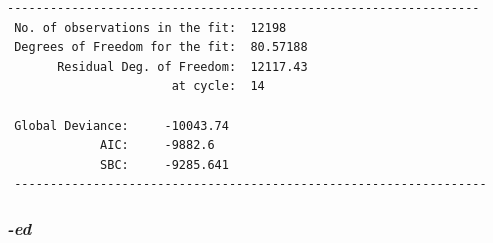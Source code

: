 \documentclass[
]{article}
\begin{document}
\begin{verbatim}
------------------------------------------------------------------ 
 No. of observations in the fit:  12198  
 Degrees of Freedom for the fit:  80.57188 
       Residual Deg. of Freedom:  12117.43  
                       at cycle:  14  
   
 Global Deviance:     -10043.74  
             AIC:     -9882.6  
             SBC:     -9285.641  
 ------------------------------------------------------------------ 
\end{verbatim}

\normalsize
\newpage

\hypertarget{ed}{%
\subsubsection{\texorpdfstring{\emph{-ed}}{-ed}}\label{ed}}

\small
\end{document}
